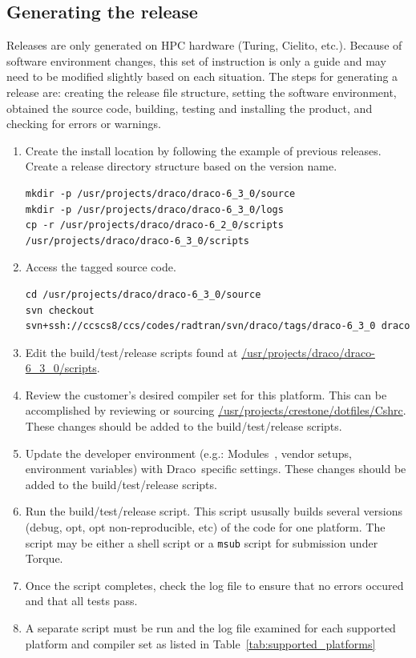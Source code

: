 \documentclass[note]{ResearchNote_pdf}
\newcommand{\draco}{{\normalfont\small\sffamily Draco}}
\begin{document}

\subsection{Generating the release}
\label{sec:generating_release}

Releases are only generated on HPC hardware (Turing, Cielito, etc.).
Because of software environment changes, this set of instruction is
only a guide and may need to be modified slightly based on each
situation. The steps for generating a release are: creating the
release file structure, setting the software environment, obtained the
source code, building, testing and installing the product, and
checking for errors or warnings.
%
\begin{enumerate}
\item Create the install location by following the example of previous
  releases.  Create a release directory structure based on the version
  name.
\begin{lstlisting}[basicstyle=\footnotesize, xleftmargin=0.20in, 
  xrightmargin=0.20in]
mkdir -p /usr/projects/draco/draco-6_3_0/source
mkdir -p /usr/projects/draco/draco-6_3_0/logs
cp -r /usr/projects/draco/draco-6_2_0/scripts /usr/projects/draco/draco-6_3_0/scripts
\end{lstlisting}
\item Access the tagged source code.
\begin{lstlisting}[basicstyle=\footnotesize, xleftmargin=0.20in, 
  xrightmargin=0.20in]
cd /usr/projects/draco/draco-6_3_0/source
svn checkout svn+ssh://ccscs8/ccs/codes/radtran/svn/draco/tags/draco-6_3_0 draco
\end{lstlisting}
\item Edit the build/test/release scripts found at
  \url{/usr/projects/draco/draco-6_3_0/scripts}. 
\item Review the customer's desired compiler set for this platform.
  This can be accomplished by reviewing or sourcing
  \url{/usr/projects/crestone/dotfiles/Cshrc}.  These changes should
  be added to the build/test/release scripts.
\item Update the developer environment (e.g.:
  Modules~\cite{modulecmd}, vendor setups, environment variables) with
  \draco\ specific settings.  These changes should be added to the
  build/test/release scripts.
\item Run the build/test/release script. This script ususally builds
  several versions (debug, opt, opt non-reproducible, etc) of the code
  for one platform.  The script may be either a shell script or a
  \texttt{msub} script for submission under Torque.
\item Once the script completes, check the log file to ensure that no
  errors occured and that all tests pass.
\item A separate script must be run and the log file examined for each
  supported platform and compiler set as listed in
  Table~\ref{tab:supported_platforms}
\end{enumerate}
\end{document}
